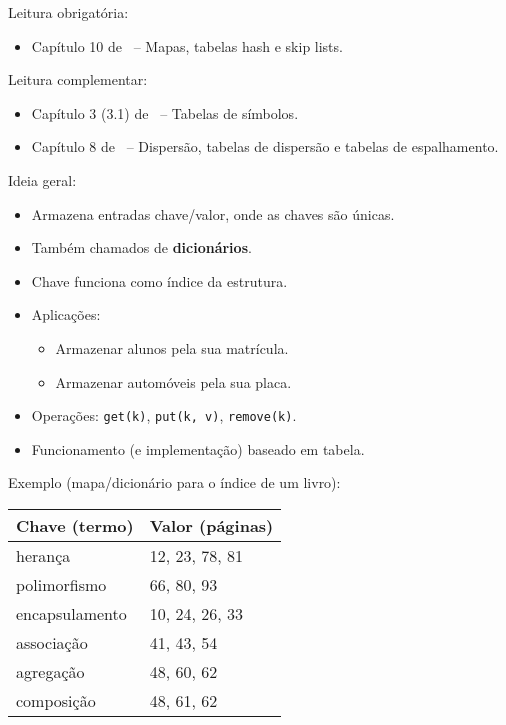 \newcommand{\defs}{../defs}


\newcommand{\content}{Mapas}
\newcommand{\class}{Algoritmos e Estruturas de Dados}
\newcommand{\shortcourse}{45EST}



\makeheader

{
Leitura obrigatória:
\begin{itemize}
	\item Capítulo 10 de~\cite{GoodrichEtAl2014} -- Mapas, tabelas hash e skip lists.
\end{itemize}

Leitura complementar:
\begin{itemize}
	\item Capítulo 3 (3.1) de~\cite{SedgewickAndWayne2011} -- Tabelas de símbolos.
	\item Capítulo 8 de~\cite{Preiss2001} -- Dispersão, tabelas de dispersão e tabelas de espalhamento.
\end{itemize}
}

\medskip


Ideia geral:
\begin{itemize}
	\item Armazena entradas chave/valor, onde as chaves são únicas.
	\item Também chamados de \textbf{dicionários}.
	\item Chave funciona como índice da estrutura.
	\item Aplicações:
	\begin{itemize}
		\item Armazenar alunos pela sua matrícula.
		\item Armazenar automóveis pela sua placa.
	\end{itemize}
	\item Operações: \texttt{get(k)}, \texttt{put(k,\,v)}, \texttt{remove(k)}.
	\item Funcionamento (e implementação) baseado em tabela.
\end{itemize}

\clearpage

Exemplo (mapa/dicionário para o índice de um livro):

\begin{table}[H]
	\centering
	\begin{tabular}{ll}
		\hline
		\textbf{Chave (termo)} & \textbf{Valor (páginas)} \\
		\hline
		herança & 12, 23, 78, 81 \\
		polimorfismo & 66, 80, 93 \\
		encapsulamento & 10, 24, 26, 33 \\
		associação & 41, 43, 54 \\
		agregação & 48, 60, 62 \\
		composição & 48, 61, 62 \\
		\hline
	\end{tabular}
\end{table}

